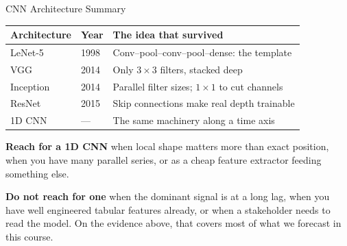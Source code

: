 \documentclass[aspectratio=169, 11pt]{beamer}
\begin{document}
\begin{frame}{CNN Architecture Summary}
  \begin{center}
    {\small
    \begin{tabular}{llp{6.6cm}}
      \toprule
      \textbf{Architecture} & \textbf{Year} & \textbf{The idea that survived} \\
      \midrule
      LeNet-5 & 1998 & Conv--pool--conv--pool--dense: the template \\
      VGG & 2014 & Only $3\times3$ filters, stacked deep \\
      Inception & 2014 & Parallel filter sizes; $1\times1$ to cut channels \\
      ResNet & 2015 & Skip connections make real depth trainable \\
      1D CNN & --- & The same machinery along a time axis \\
      \bottomrule
    \end{tabular}
    }
  \end{center}

  \vspace{0.15cm}
  \textbf{Reach for a 1D CNN} when local shape matters more than exact position, when you have
  many parallel series, or as a cheap feature extractor feeding something else.

  \vspace{0.1cm}
  \textbf{Do not reach for one} when the dominant signal is at a long lag, when you have well
  engineered tabular features already, or when a stakeholder needs to read the model. On the
  evidence above, that covers most of what we forecast in this course.
\end{frame}
\end{document}
